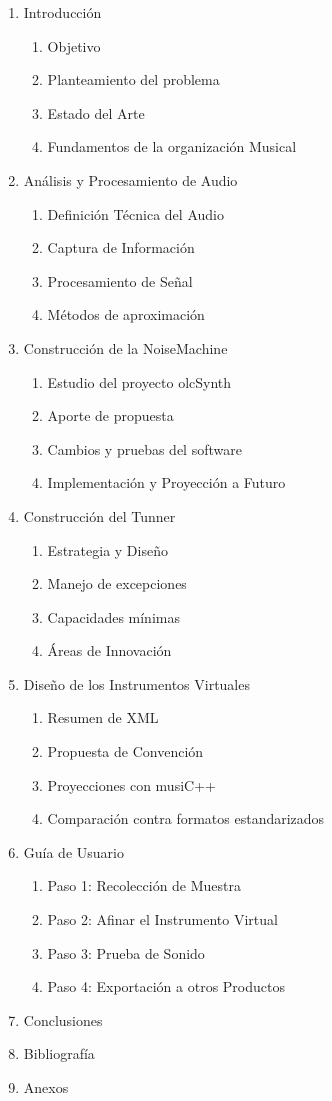 \documentclass{book}
\begin{document}
	\begin{enumerate}
		\item Introducción
		\begin{enumerate}
			\item Objetivo
			\item Planteamiento del problema
			\item Estado del Arte
			\item Fundamentos de la organización Musical
		\end{enumerate}
		\item Análisis y Procesamiento de Audio
		\begin{enumerate}
			\item Definición Técnica del Audio
			\item Captura de Información
			\item Procesamiento de Señal
			\item Métodos de aproximación
		\end{enumerate}
		\item Construcción de la NoiseMachine
		\begin{enumerate}
			\item Estudio del proyecto olcSynth
			\item Aporte de propuesta
			\item Cambios y pruebas del software
			\item Implementación y Proyección a Futuro
		\end{enumerate}
		\item Construcción del Tunner
		\begin{enumerate}
			\item Estrategia y Diseño
			\item Manejo de excepciones
			\item Capacidades mínimas
			\item Áreas de Innovación
		\end{enumerate}
		\pagebreak\item Diseño de los Instrumentos Virtuales
		\begin{enumerate}
			\item Resumen de XML
			\item Propuesta de Convención
			\item Proyecciones con musiC++
			\item Comparación contra formatos estandarizados
		\end{enumerate}
		\item Guía de Usuario
		\begin{enumerate}
			\item Paso 1: Recolección de Muestra
			\item Paso 2: Afinar el Instrumento Virtual
			\item Paso 3: Prueba de Sonido
			\item Paso 4: Exportación a otros Productos
		\end{enumerate}
		\item Conclusiones
		\item Bibliografía
		\item Anexos
	\end{enumerate}\pagebreak
\end{document}
